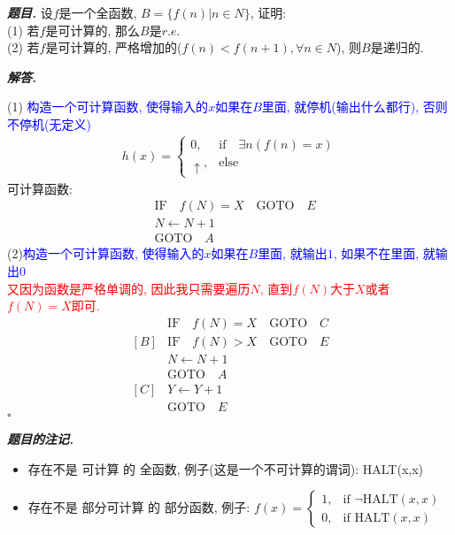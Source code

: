 \documentclass[10pt, a4paper, oneside]{ctexart}
\newenvironment{problem}{\begin{framed}\par\noindent\textbf{\textit{题目. }}}{\end{framed}\par}
\newenvironment{solution}{%
  \par\noindent\textbf{\textit{解答. }}\ignorespaces
}{%
  \hfill\ensuremath{\square}\par %
}
\newenvironment{note}{\par\noindent\textbf{\textit{题目的注记. }}\ignorespaces}{\par}
\begin{document}
    \begin{problem}
    设$f$是一个全函数, $B=\{f(n)| n\in N\}$, 证明:\\
    (1) 若$f$是可计算的, 那么$B$是$r.e.$\\
    (2) 若$f$是可计算的, 严格增加的($f(n)<f(n+1), \forall n\in N$), 则$B$是递归的.
    \end{problem}
    \begin{solution}
        (1) \textcolor{blue}{构造一个可计算函数, 使得输入的$x$如果在$B$里面, 就停机(输出什么都行), 否则不停机(无定义)}
        \begin{align*}
            h(x) = \begin{cases}
                0, &\text{if} \quad \exists n (f(n)=x)\\
                \uparrow, &\text{else}
            \end{cases}
        \end{align*}
        可计算函数:
        \begin{align*}
            [A] &\text{IF} \quad f(N)=X\quad \text{GOTO} \quad E\\
            & N\leftarrow N+1\\
            & \text{GOTO} \quad A
        \end{align*}
        (2)\textcolor{blue}{构造一个可计算函数, 使得输入的$x$如果在$B$里面, 就输出$1$, 如果不在里面, 就输出$0$}\\
        \textcolor{red}{又因为函数是严格单调的, 因此我只需要遍历$N$, 直到$f(N)$大于$X$或者$f(N)=X$即可.}
        \begin{align*}
            [A] &\text{IF} \quad f(N)=X\quad \text{GOTO} \quad C\\
            [B] &\text{IF} \quad f(N)>X\quad \text{GOTO} \quad E\\
            & N\leftarrow N+1\\
            & \text{GOTO} \quad A\\
            [C]& Y\leftarrow Y+1\\
            & \text{GOTO} \quad E
        \end{align*}
    \end{solution}
    \begin{note}
        \begin{itemize}
            \item 存在不是 可计算 的 全函数, 例子(这是一个不可计算的谓词): HALT(x,x)
            \item 存在不是 部分可计算 的 部分函数, 例子: $f(x)= \begin{cases}
                1, & \text{if } \neg \text{HALT}(x,x)\\
                0, & \text{if } \text{HALT}(x,x)
            \end{cases}$
        \end{itemize}
    \end{note}
    
\end{document}
